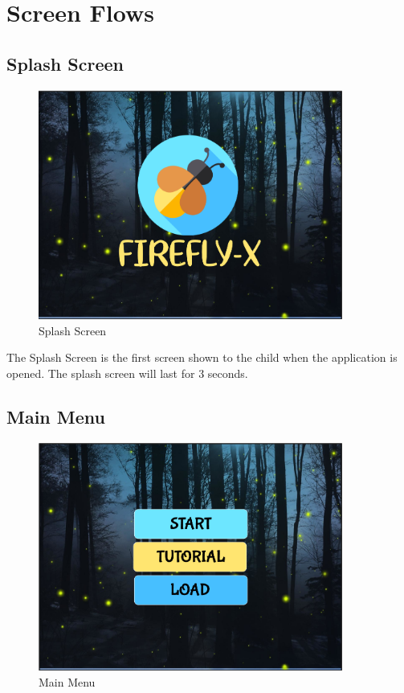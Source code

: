 \section{Screen Flows}


\subsection{Splash Screen}

\begin{figure}[H]
    \centering
    \includegraphics[width=10cm]{figures/Splash.png}
    \caption{Splash Screen}
    \label{fig:splash}
\end{figure}

The Splash Screen is the first screen shown to the child when the application is opened. The splash screen will last for 3 seconds.

\subsection{Main Menu}

\begin{figure}[H]
    \centering
    \includegraphics[width=10cm]{figures/MainMenu.png}
    \caption{Main Menu}
    \label{fig:mainmenu}
\end{figure}

